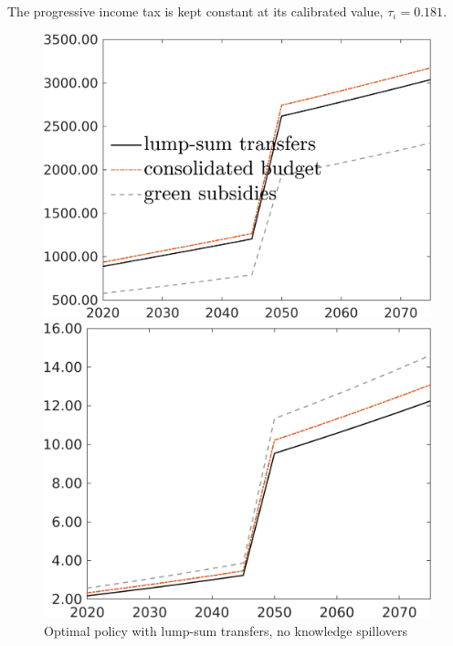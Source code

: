 The progressive income tax is kept constant at its calibrated value, $\tau_{\iota}=0.181$. 

\begin{figure}[h!!!]
	\centering
	\caption{Optimal policy with lump-sum transfers, no knowledge spillovers
	}\label{fig:opt_TLs_noknow}
	\begin{minipage}[]{0.32\textwidth}
		\includegraphics[width=1\textwidth]{../../codding_model/own_basedOnFried/optimalPol_010922_revision/figures/all_13Sept22/CompRed_TaulCalib_Tauf_spillover0_knspil0_nsk0_xgr0_sep0_LFlimit1_emsbase0_countec0_GovRev0_etaa0.79_lgd1.png}
	\end{minipage}
\begin{minipage}[]{0.32\textwidth}
\includegraphics[width=1\textwidth]{../../codding_model/own_basedOnFried/optimalPol_010922_revision/figures/all_13Sept22/CompRed_TaulCalib_GFF_spillover0_knspil0_nsk0_xgr0_sep0_LFlimit1_emsbase0_countec0_GovRev0_etaa0.79_lgd0.png}

\end{minipage}
\end{figure}
